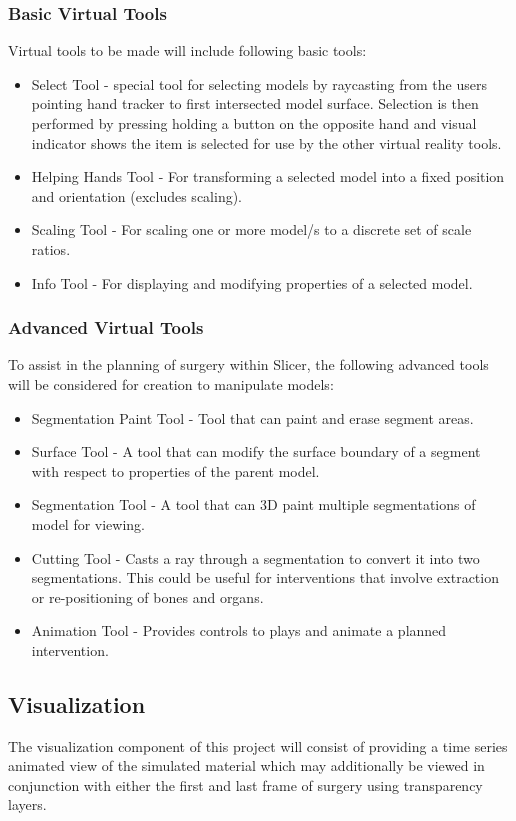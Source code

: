 \subsubsection{Basic Virtual Tools}
Virtual tools to be made will include following basic tools:
\begin{itemize}
\item Select Tool - special tool for selecting models by raycasting from the users pointing hand tracker to first intersected model surface. Selection is then performed by pressing holding a button on the opposite hand and visual indicator shows the item is selected for use by the other virtual reality tools.
\item Helping Hands Tool - For transforming a selected model into a fixed position and orientation (excludes scaling).
\item Scaling Tool - For scaling one or more model/s to a discrete set of scale ratios.
\item Info Tool - For displaying and modifying properties of a selected model.
\end{itemize}

\subsubsection{Advanced Virtual Tools}
To assist in the planning of surgery within Slicer, the following advanced tools will be considered for creation to manipulate models:
\begin{itemize}
\item Segmentation Paint Tool - Tool that can paint and erase segment areas. 
\item Surface Tool - A tool that can modify the surface boundary of a segment with respect to properties of the parent model.
\item Segmentation Tool - A tool that can 3D paint multiple segmentations of model for viewing.
\item Cutting Tool - Casts a ray through a segmentation to convert it into two segmentations. This could be useful for interventions that involve extraction or re-positioning of bones and organs. 
\item Animation Tool - Provides controls to plays and animate a planned intervention.
\end{itemize}

\subsection{Visualization}
The visualization component of this project will consist of providing a time series animated view of the simulated material which may additionally be viewed in conjunction with either the first and last frame of surgery using transparency layers.

